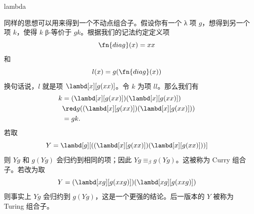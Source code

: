 \documentclass[../../../include/open-logic-section]{subfiles}
\begin{document}
\begin{tagblock}{lambda}
\begin{digress}
同样的思想可以用来得到一个不动点组合子。假设你有一个 λ 项 $g$，想得到另一个项 $k$，使得 $k$ β-等价于 $gk$。根据我们的记法约定定义项
\[
\fn{diag}(x) = xx
\]
和
\[
l(x) = g(\fn{diag}(x))
\]
换句话说，$l$ 就是项 $\lambd[x][g(xx)]$。令 $k$ 为项 $ll$。那么我们有
\begin{align*}
k & = (\lambd[x][g(xx)])(\lambd[x][g(xx)]) \\
& \red  g((\lambd[x][g(xx)])(\lambd[x][g(xx)])) \\
& = gk.
\end{align*}
若取
\[
Y = \lambd[g][((\lambd[x][g(xx)])(\lambd[x][g(xx)]))]
\]
则 $Yg$ 和 $g(Yg)$ 会归约到相同的项；因此 $Yg \equiv_\beta g(Yg)$。这被称为 Curry 组合子。若改为取
\[
Y = (\lambd[xg][g(xxg)])(\lambd[xg][g(xxg)])
\]
则事实上 $Yg$ 会归约到 $g(Yg)$，这是一个更强的结论。后一版本的 $Y$ 被称为 Turing 组合子。
\end{digress}
\end{tagblock}
\end{document}
